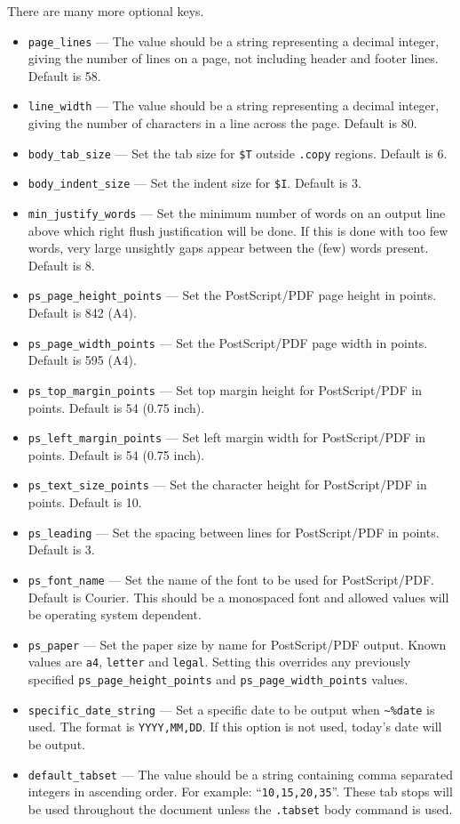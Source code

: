 \documentclass[a4paper,twoside,11pt]{article}
\newcommand{\newpara}{\par\vspace{4mm}\noindent}
\newcommand{\textttc}[1]{\texttt{\textcolor{OurRed}{#1}}}
\begin{document}
\newpara
There are many more optional keys.
\begin{itemize}
\item \textttc{page\_lines} --- The value should be a string representing a decimal integer, giving the number of
  lines on a page, not including header and footer lines. Default is 58.
\item \textttc{line\_width} --- The value should be a string representing a decimal integer, giving the number of
  characters in a line across the page. Default is 80.
\item \textttc{body\_tab\_size} --- Set the tab size for \texttt{\$T} outside \texttt{.copy} regions.
  Default is 6.
\item \textttc{body\_indent\_size} --- Set the indent size for \texttt{\$I}. Default is 3.
\item \textttc{min\_justify\_words} --- Set the minimum number of words on an output line above which
  right flush justification will be done. If this is done with too few words, very large unsightly gaps
  appear between the (few) words present. Default is 8.
\item \textttc{ps\_page\_height\_points} --- Set the PostScript/PDF page height in points. Default is 842 (A4).
\item \textttc{ps\_page\_width\_points} --- Set the PostScript/PDF page width in points. Default is 595 (A4).
\item \textttc{ps\_top\_margin\_points} --- Set top margin height for PostScript/PDF in points. Default is 54 (0.75 inch).
\item \textttc{ps\_left\_margin\_points} --- Set left margin width for PostScript/PDF in points. Default is 54 (0.75 inch).
\item \textttc{ps\_text\_size\_points} --- Set the character height for PostScript/PDF in points. Default is 10.
\item \textttc{ps\_leading} --- Set the spacing between lines for PostScript/PDF in points. Default is 3.
\item \textttc{ps\_font\_name} --- Set the name of the font to be used for PostScript/PDF. Default is Courier.
  This should be a monospaced font and allowed values will be operating system dependent.
\item \textttc{ps\_paper} --- Set the paper size by name for PostScript/PDF output.
  Known values are \texttt{a4}, \texttt{letter} and \texttt{legal}. Setting this overrides any previously
  specified \texttt{ps\_page\_height\_points} and \texttt{ps\_page\_width\_points} values.
\item \textttc{specific\_date\_string} --- Set a specific date to be output when \texttt{\textasciitilde\%date}
  is used. The format is \texttt{YYYY,MM,DD}. If this option is not used, today's date will be output.
\item \textttc{default\_tabset} --- The value should be a string containing comma separated integers in ascending
  order. For example: ``\texttt{10,15,20,35}''. These tab stops will be used throughout the document unless
  the \textttc{.tabset} body command is used.
\end{itemize}
\end{document}
